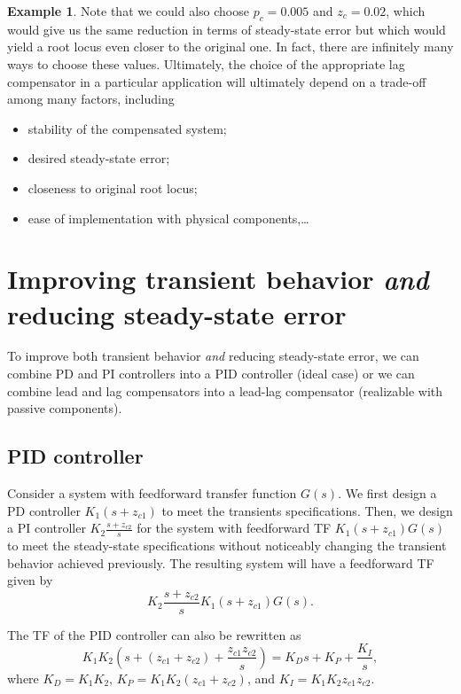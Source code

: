 \documentclass[a4paper,11pt]{report}
\theoremstyle{definition}
\newtheorem{mdexample}{Example}
\newenvironment{example}%
  {\vspace{0.1cm}\begin{mdframed}[backgroundcolor=lightgray]\begin{mdexample}}%
  {\end{mdexample}\end{mdframed}\vspace{0.1cm}}
\begin{document}
\begin{example}
  Note that we could also choose $p_c=0.005$ and $z_c=0.02$, which
  would give us the same reduction in terms of steady-state error but
  which would yield a root locus even closer to the original
  one. In fact, there are infinitely many ways to choose these
  values. Ultimately, the choice of the appropriate lag compensator in a
  particular application will ultimately depend on a trade-off among
  many factors, including
  \begin{itemize}
  \item stability of the compensated system;
  \item desired steady-state error;
  \item closeness to original root locus;
  \item ease of implementation with physical components,\dots
  \end{itemize}

\end{example}


\section{Improving transient behavior \emph{and} reducing steady-state
  error}

To improve both transient behavior \emph{and} reducing steady-state
error, we can combine PD and PI controllers into a PID controller
(ideal case) or we can combine lead and lag compensators into a
lead-lag compensator (realizable with passive components).


\subsection{PID controller}

Consider a system with feedforward transfer function $G(s)$. We first
design a PD controller $K_1(s+z_{c1})$ to meet the transients
specifications. Then, we design a PI controller
$K_2\frac{s+z_{c2}}{s}$ for the system with feedforward TF
$K_1(s+z_{c1})G(s)$ to meet the steady-state specifications without
noticeably changing the transient behavior achieved previously. The
resulting system will have a feedforward TF given by
\[
K_2\frac{s+z_{c2}}{s}K_1(s+z_{c1})G(s).
\]

The TF of the PID controller can also be rewritten as
\[
 K_1K_2\left(s+(z_{c1}+z_{c2})+\frac{z_{c1}z_{c2}}{s}\right)
= K_D s  + K_P + \frac{K_I}{s},
\]
where $K_D=K_1K_2$, $K_P=K_1K_2(z_{c1}+z_{c2})$, and
$K_I=K_1K_2z_{c1}z_{c2}$.
\end{document}
